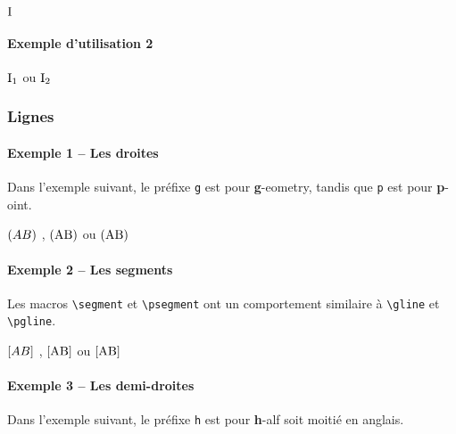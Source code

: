 \documentclass[12pt,a4paper]{article}
\newcommand\env[1]{\texttt{#1}}
\newcommand\macro[1]{\env{\textbackslash{}#1}}
\theoremstyle{definition}
\begin{document}
\begin{latexex}
$\pt{I}$
\end{latexex}




\paragraph{Exemple d'utilisation 2}

\begin{latexex}
$\pt*{I}{1}$ ou
$\pt*{I}{2}$
\end{latexex}




\subsubsection{Lignes}

\paragraph{Exemple 1 -- Les droites}

Dans l'exemple suivant, le préfixe \verb+g+ est pour \textbf{g}-eometry, tandis que \verb+p+ est pour \textbf{p}-oint.

\begin{latexex}
$\gline{A}{B}$ ,
$\gline{\pt{A}}{\pt{B}}$ ou
$\pgline{A}{B}$
\end{latexex}




\paragraph{Exemple 2 -- Les segments}

Les macros \macro{segment} et \macro{psegment} ont un comportement similaire à \macro{gline} et \macro{pgline}.

\begin{latexex}
$\segment{A}{B}$ ,
$\segment{\pt{A}}{\pt{B}}$ ou
$\psegment{A}{B}$
\end{latexex}




\paragraph{Exemple 3 -- Les demi-droites}

Dans l'exemple suivant, le préfixe \verb+h+ est pour \textbf{h}-alf soit moitié en anglais.
\end{document}
